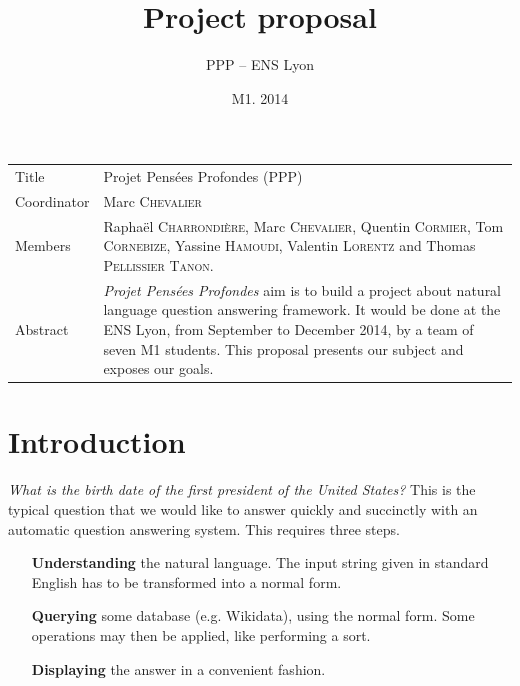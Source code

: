 \documentclass[a4paper,10pt]{article}
\title{Project proposal}
\author{PPP \--- ENS Lyon}
\date{M1. 2014}
\begin{document}
\maketitle

\newlength{\title}
\settowidth{\title}{Coordinator }

\newlength{\object}
\setlength{\object}{\textwidth} \addtolength{\object}{-\title} \addtolength{\object}{-6.8pt} 
	\addtolength{\object}{-2\tabcolsep}

\renewcommand{\arraystretch}{1.5}

\begin{center}
\begin{tabular}{@{}|p{\title}p{\object}@{}|}
\hline
Title & Projet Pensées Profondes (PPP)\\
Coordinator & Marc \textsc{Chevalier}\\
Members & Raphaël \textsc{Charrondière}, Marc \textsc{Chevalier}, Quentin 
      \textsc{Cormier}, Tom \textsc{Cornebize}, \linebreak Yassine \textsc{Hamoudi}, 
      Valentin \textsc{Lorentz} and Thomas \textsc{Pellissier} \textsc{Tanon}.\\
Abstract & \emph{Projet Pensées Profondes} aim is to build a project about natural language question answering framework.
It would be done at the ENS Lyon, from September to December 2014, by a team of seven M1 students. This proposal presents
our subject and exposes our goals.\\
\hline
\end{tabular}
\end{center}

\section{Introduction}

\emph{What is the birth date of the first president of the United States?} This is the typical question that we would like to
answer quickly and succinctly with an automatic question answering system. This requires three steps.

\begin{itemize}
\item[\textbf{Understanding}] the natural language. The input string given in standard 
English has to be transformed into a normal form. 

\item[\textbf{Querying}] some database (e.g. Wikidata), using the normal form.
Some operations may then be applied, like performing a sort.

\item[\textbf{Displaying}] the answer in a convenient fashion.
\end{itemize}
\end{document}

